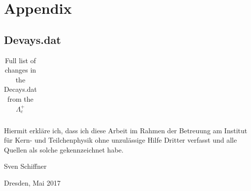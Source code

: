 \appendix

\chapter{Appendix}
\section{Devays.dat}
\begin{longtable}{| c | c | c | c |}
  \caption{Full list of changes in the Decays.dat from the \(\Lambda_c^+\)}\label{ta:changes-full}\\ 
  \hline
  
\end{longtable}


\clearpage
\thispagestyle{empty}
\vspace*{1.5em}

Hiermit erkläre ich, dass ich diese Arbeit im Rahmen der Betreuung am Institut
für Kern- und Teilchenphysik ohne unzulässige Hilfe Dritter verfasst und alle Quellen als solche gekennzeichnet habe.

\vspace*{45em}

Sven Schiffner \par
Dresden, Mai 2017


